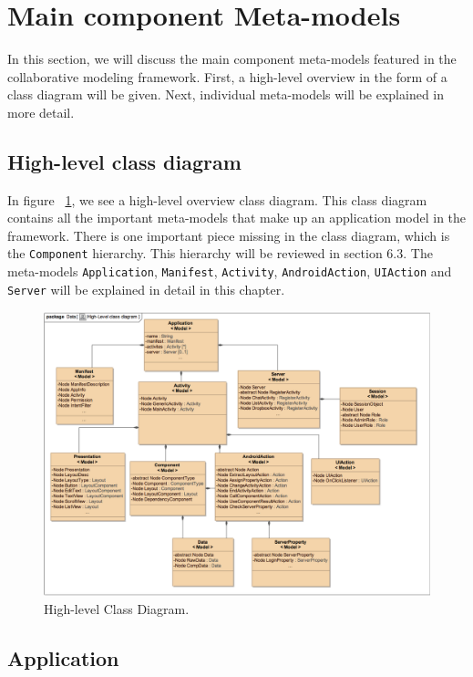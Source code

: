 \section{Main component Meta-models}

In this section, we will discuss the main component meta-models featured in the collaborative modeling framework. First, a high-level overview in the form of a class diagram will be given. Next, individual meta-models will be explained in more detail.

\subsection{High-level class diagram}

In figure ~\ref{fig:highlevel_mm}, we see a high-level overview class diagram. This class diagram contains all the important meta-models that make up an application model in the framework. There is one important piece missing in the class diagram, which is the \texttt{Component} hierarchy. This hierarchy will be reviewed in section 6.3. The meta-models \texttt{Application}, \texttt{Manifest}, \texttt{Activity}, \texttt{AndroidAction}, \texttt{UIAction} and \texttt{Server} will be explained in detail in this chapter. 
\begin{figure}[h!]
\centering
\includegraphics[width=1.02\textwidth]{images/chap6_high_level.png}
\caption{High-level Class Diagram.}
\label{fig:highlevel_mm}
\end{figure}

\subsection{Application}

